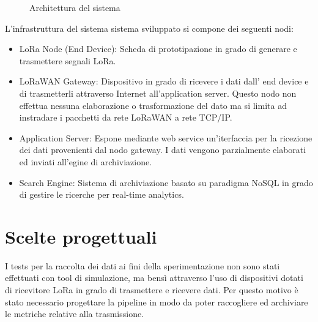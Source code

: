 \documentclass[12pt,a4paper,openright,twoside]{report}
\begin{document}
\begin{figure}[h]                      
\begin{center} 
\caption[Architettura del sistema]{Architettura del sistema}\label{fig:ottava}
\end{center}
\end{figure}


L'infrastruttura del sistema sistema sviluppato si compone dei seguenti nodi:
\begin{itemize}                       
\item LoRa Node (End Device): Scheda di prototipazione in grado di generare e trasmettere segnali LoRa.   
\item LoRaWAN Gateway: Dispositivo in grado di ricevere i dati dall' end device e di trasmetterli attraverso Internet all'application server. Questo nodo non effettua nessuna elaborazione o trasformazione del dato ma si limita ad instradare i pacchetti da rete LoRaWAN a rete TCP/IP.  
\item Application Server: Espone mediante web service un'iterfaccia per la ricezione dei dati provenienti dal nodo gateway. I dati vengono parzialmente elaborati ed inviati all'egine di archiviazione.
\item Search Engine: Sistema di archiviazione basato su paradigma NoSQL in grado di gestire le ricerche per real-time analytics.  
\end{itemize}



 \section{Scelte progettuali}
I tests per la raccolta dei dati ai fini della sperimentazione non sono stati effettuati con tool di simulazione, ma bens\`i attraverso l'uso di dispositivi dotati di ricevitore LoRa in grado di trasmettere e ricevere dati. 
Per questo motivo \`e stato necessario progettare la pipeline in modo da poter raccogliere ed archiviare le metriche relative alla trasmissione.
\end{document}
